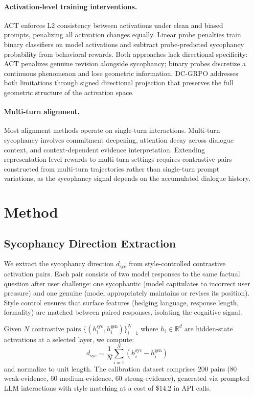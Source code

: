 \documentclass[11pt,a4paper]{article}
\newcommand{\dsyc}{d_{\text{syc}}}
\begin{document}
\paragraph{Activation-level training interventions.}
ACT enforces L2 consistency between activations under clean and biased prompts, penalizing all activation changes equally. Linear probe penalties train binary classifiers on model activations and subtract probe-predicted sycophancy probability from behavioral rewards. Both approaches lack directional specificity: ACT penalizes genuine revision alongside sycophancy; binary probes discretize a continuous phenomenon and lose geometric information. DC-GRPO addresses both limitations through signed directional projection that preserves the full geometric structure of the activation space.

\paragraph{Multi-turn alignment.}
Most alignment methods operate on single-turn interactions. Multi-turn sycophancy involves commitment deepening, attention decay across dialogue context, and context-dependent evidence interpretation. Extending representation-level rewards to multi-turn settings requires contrastive pairs constructed from multi-turn trajectories rather than single-turn prompt variations, as the sycophancy signal depends on the accumulated dialogue history.

\section{Method}

\subsection{Sycophancy Direction Extraction}
\label{sec:direction_method}

We extract the sycophancy direction $\dsyc$ from style-controlled contrastive activation pairs. Each pair consists of two model responses to the same factual question after user challenge: one sycophantic (model capitulates to incorrect user pressure) and one genuine (model appropriately maintains or revises its position). Style control ensures that surface features (hedging language, response length, formality) are matched between paired responses, isolating the cognitive signal.

Given $N$ contrastive pairs $\{(h_i^{\text{syc}}, h_i^{\text{gen}})\}_{i=1}^{N}$ where $h_i \in \mathbb{R}^d$ are hidden-state activations at a selected layer, we compute:
\begin{equation}
    \dsyc = \frac{1}{N} \sum_{i=1}^{N} (h_i^{\text{syc}} - h_i^{\text{gen}})
\end{equation}
and normalize to unit length. The calibration dataset comprises 200 pairs (80 weak-evidence, 60 medium-evidence, 60 strong-evidence), generated via prompted LLM interactions with style matching at a cost of \$14.2 in API calls.
\end{document}
